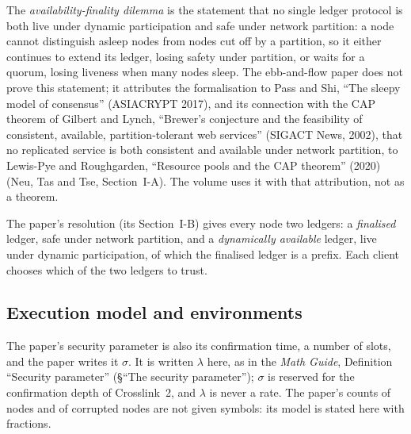 \documentclass[11pt,a4paper]{article}
\theoremstyle{definition}
\begin{document}
The \emph{availability-finality dilemma} is the statement that no single
ledger protocol is both live under dynamic participation and safe under
network partition: a node cannot distinguish asleep nodes from nodes cut off
by a partition, so it either continues to extend its ledger, losing safety
under partition, or waits for a quorum, losing liveness when many nodes
sleep. The ebb-and-flow paper does not prove this statement; it attributes
the formalisation to Pass and Shi, ``The sleepy model of consensus''
(ASIACRYPT 2017), and its connection with the CAP theorem of Gilbert and
Lynch, ``Brewer's conjecture and the feasibility of consistent, available,
partition-tolerant web services'' (SIGACT News, 2002), that no replicated
service is both consistent and available under network partition, to
Lewis-Pye and Roughgarden, ``Resource pools and the CAP theorem'' (2020)
(Neu, Tas and Tse, Section~I-A). The volume uses it with that attribution, not
as a theorem.

The paper's resolution (its Section~I-B) gives every node two ledgers: a
\emph{finalised} ledger, safe under network partition, and a
\emph{dynamically available} ledger, live under dynamic participation, of
which the finalised ledger is a prefix. Each client chooses which of the two
ledgers to trust.

\subsection{Execution model and environments}\label{sec:model-execution}

The paper's security parameter is also its confirmation time, a number of
slots, and the paper writes it $\sigma$. It is written $\lambda$ here, as in
the \emph{Math Guide}, Definition ``Security parameter'' (\S``The security
parameter''); $\sigma$ is reserved for the confirmation depth of
Crosslink~2, and $\lambda$ is never a rate. The paper's counts of nodes and
of corrupted nodes are not given symbols: its model is stated here with
fractions.
\end{document}
